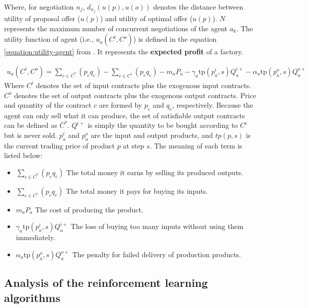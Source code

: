 Where, for negotiation $n_j$, $d_{n_j}(u(p), u(o))$ denotes the distance between utility of proposal offer ($u(p)$) and utility of optimal offer ($u(p)$). $N$ represents the maximum number of concurrent negotiations of the agent $a_k$. The utility function of agent (i.e., $u_{a}\left(C^{i}, C^{o}\right)$) is defined in the equation \ref{equation:utility-agent} from \parencite{Mohammad2021}. It represents the \textbf{expected profit} of a factory.

\begin{equation} \label{equation:utility-agent}
\begin{aligned}
u_{a}\left(C^{i}, C^{o}\right)=\sum_{c \in \bar{C}^{o}}\left(p_{c} q_{c}\right)-\sum_{c \in C^{i}}\left(p_{c} q_{c}\right)-m_{a} P_{a}-\gamma_{a} \mathrm{t} \mathrm{p}\left(p_{a}^{i}, s\right) Q_{a}^{i+}-\alpha_{a} \mathrm{tp}\left(p_{a}^{o}, s\right) Q_{a}^{o+}
\end{aligned}
\end{equation}
Where $C^{i}$ denotes the set of input contracts plus the exogenous input contracts. $C^{o}$ denotes the set of output contracts plus the exogenous output contracts. Price and quantity of the contract $c$ are formed by $p_c$ and $q_c$, respectively. Because the agent can only sell what it can produce, the set of satisfiable output contracts can be defined as $\bar{C}^{o}$. $Q^{i+}$ is simply the quantity to be bought  according to $C^{i}$ but is never sold. $p_{a}^{i}$ and $p_{a}^{o}$ are the input and output products, and $tp(p, s)$ is the current trading price of product $p$ at step $s$. The meaning of each term is listed below:
\begin{itemize}
\item \textbf{$\sum_{c \in \bar{C}^{o}}\left(p_{c} q_{c}\right)$} The total money it earns by selling its produced outputs.  
\item \textbf{$\sum_{c \in C^{i}}\left(p_{c} q_{c}\right)$} The total money it pays for buying its inputs.
\item \textbf{$m_{a} P_{a}$} The cost of producing the product.
\item \textbf{$\gamma_{a} \mathrm{t} \mathrm{p}\left(p_{a}^{i}, s\right) Q_{a}^{i+}$} The loss of buying too many inputs without using them immediately.
\item \textbf{$\alpha_{a} \mathrm{tp}\left(p_{a}^{o}, s\right) Q_{a}^{o+}$} The penalty for failed delivery of production products.
\end{itemize}

\subsection{Analysis of the reinforcement learning algorithms}
